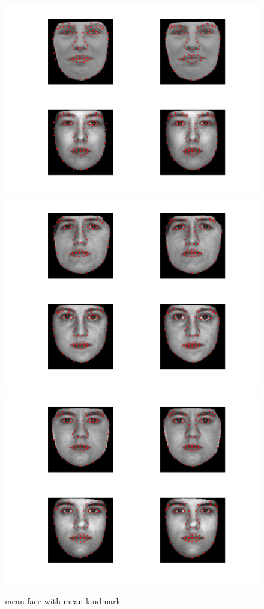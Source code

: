 \documentclass[12pt]{ctexart}
\begin{document}
\begin{enumerate}
\begin{figure}[H]
\includegraphics[scale=0.18]{b_com_face_lm6.jpg}
\includegraphics[scale=0.18]{b_com_face_lm7.jpg}
\includegraphics[scale=0.18]{b_com_face_lm8.jpg}
  \caption{mean face with mean landmark}
\end{figure}


\end{enumerate}
\end{document}
